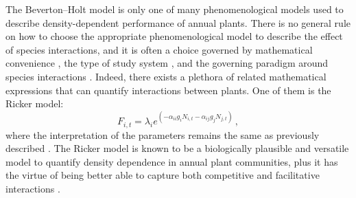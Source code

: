 \begin{refsection}
The Beverton--Holt model is only one of many phenomenological models used to describe density-dependent performance of annual plants. There is no general rule on how to choose the appropriate phenomenological model to describe the effect of species interactions, and it is often a choice governed by mathematical convenience \citep{mayfield2017higher}, the type of study system \citep{godwin2020empiricist}, and the governing paradigm around species interactions \citep{martyn2021identifying}. Indeed, there exists a plethora of related mathematical expressions that can quantify interactions between plants. One of them is the Ricker  model:
 \begin{equation}
 \label{Ricker}
   F_{i,t} = \lambda_{i} e^{(- \alpha_{ii}g_{i}N_{i,t} - \alpha_{ij}g_{j}N_{j,t})}\,,
\end{equation}
where the interpretation of the parameters remains the same as previously described \citep{ricker1954effects}. The Ricker model is known to be a biologically plausible and versatile model to quantify density dependence in annual plant communities, plus it has the virtue of being better able to capture both competitive and facilitative interactions \citep{mayfield2017higher,bimler_accurate_2018}.



\end{refsection}

